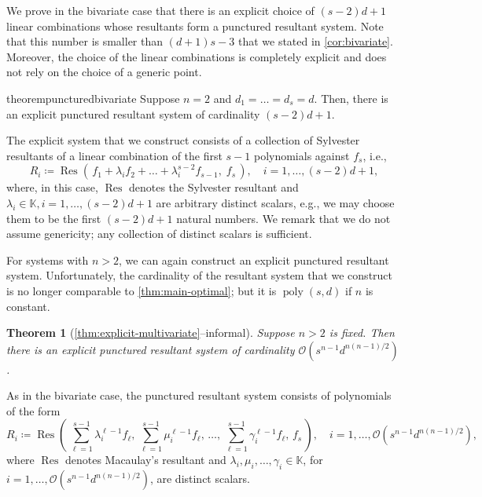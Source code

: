 \documentclass[11pt,a4paper]{article}
\newtheorem{theorem}{Theorem}[section]
\numberwithin{equation}{section}
\newcommand{\KK}{\mathbb{K}}
\newcommand{\cO}{\mathcal{O}}
\DeclareMathOperator{\poly}{poly}
\DeclareMathOperator{\Res}{Res}
\begin{document}
We prove in the bivariate case that there is an explicit choice of $(s-2)d+1$ linear combinations whose resultants form a punctured resultant system.
Note that this number is smaller than $(d+1)s-3$ that we stated in \cref{cor:bivariate}.
Moreover, the choice of the linear combinations is completely explicit and does not rely on the choice of a generic point. 
\begin{restatable}{theorem}{puncturedbivariate}
\label{thm:bivariate-explicit}
	Suppose $n=2$ and $d_1=\dots=d_s=d$. 
	Then, there is an explicit punctured resultant system of cardinality $(s-2)d+1$.
\end{restatable}
\noindent
The explicit system that we construct consists of a collection of Sylvester resultants of a linear combination of the first $s-1$ polynomials against $f_s$, i.e., \[
R_i\coloneqq \Res\left(\, f_1 + \lambda_i f_2 + \dots + \lambda_i^{s-2} f_{s-1} ,\; f_s\, \right), \quad i=1,\dots,(s-2)d+1,
\] 
where, in this case, $\Res$ denotes the Sylvester resultant and $\lambda_i\in\KK, i=1,\dots,(s-2)d+1$ are arbitrary distinct scalars, e.g., we may choose them to be the first $(s-2)d+1$ natural numbers.
We remark that we do not assume genericity; any collection of distinct scalars is sufficient.

For systems with $n>2$, we can again construct an explicit punctured resultant system.
Unfortunately, the cardinality of the resultant system that we construct is no longer comparable to  \cref{thm:main-optimal};
but it is $\poly(s,d)$ if $n$ is constant.

\begin{theorem}[\cref{thm:explicit-multivariate}--informal]
    \label{thm:intro-explicit-multivariate}
    Suppose $n>2$ is fixed.
    Then there is an explicit punctured resultant system of cardinality $ \cO(s^{n-1} d^{n(n-1)/2})$.
\end{theorem}
\noindent
As in the bivariate case, the punctured resultant system consists of polynomials of the form \[
R_i\coloneqq \Res\left(\, \sum_{\ell=1}^{s-1} \lambda_i^{\ell-1} f_\ell, \, \sum_{\ell=1}^{s-1} \mu_i^{\ell-1} f_\ell,\, \dots,\, \sum_{\ell=1}^{s-1} \gamma_i^{\ell-1} f_\ell, \, f_s\,\right),\quad i=1,\dots,\cO(s^{n-1}d^{n(n-1)/2}),
\] where $\Res$ denotes Macaulay's resultant and $\lambda_i,\mu_i,\dots,\gamma_i\in\KK$, for $i=1,\dots,\cO(s^{n-1}d^{n(n-1)/2})$, are distinct scalars.
\end{document}
